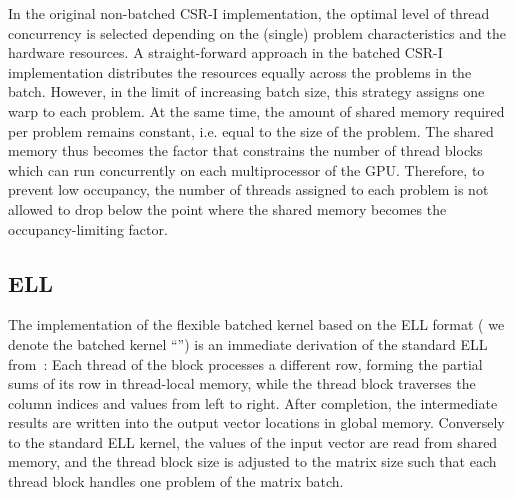 In the original non-batched CSR-I implementation, the optimal level of thread
concurrency is selected depending on the (single) problem characteristics and the hardware resources.
A straight-forward approach in the batched CSR-I implementation 
distributes the resources equally across the problems in the batch.
However, in the limit of increasing batch size, this strategy assigns one warp to each problem.
At the same time, the amount of shared memory required per problem remains constant,
i.e. equal to the size of the problem.
The shared memory thus becomes the factor that constrains the number of
thread blocks which can run concurrently on each multiprocessor of the GPU.
Therefore, to prevent low occupancy, the number of threads assigned to each
problem is not allowed to drop below the point where the shared memory becomes the 
occupancy-limiting factor.

\subsection{ELL}
The implementation of the flexible batched \spmv kernel based on the ELL format
( we denote the batched kernel ``\ell'')
is an immediate derivation of the standard ELL \spmv from~\cite{garlandspmv}:
Each thread of the block processes a different row, forming the partial
sums of its row in thread-local memory, while the thread block traverses the column indices
and values from left to right. After completion, the intermediate results are written into the output
vector locations in global memory.
Conversely to the standard ELL kernel, the values of the input vector are read from shared memory,
and the thread block size is adjusted to the matrix size such that each thread block handles
one problem of the matrix batch.

